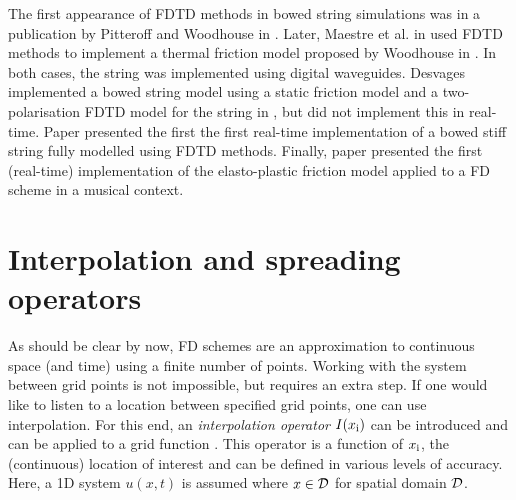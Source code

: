 The first appearance of FDTD methods in bowed string simulations was in a publication by Pitteroff and Woodhouse in \cite{Pitteroff1998}. Later, Maestre et al. in \cite{Maestre2014} used FDTD methods to implement a thermal friction model proposed by Woodhouse in \cite{Woodhouse2003}. In both cases, the string was implemented using digital waveguides. Desvages implemented a bowed string model using a static friction model and a two-polarisation FDTD model for the string in \cite{Desvages2016, Desvages2018}, but did not implement this in real-time. Paper \citeP[A] presented the first the first real-time implementation of a bowed stiff string fully modelled using FDTD methods. Finally, paper \citeP[C] presented the first (real-time) implementation of the elasto-plastic friction model applied to a FD scheme in a musical context.

\section{Interpolation and spreading operators}\label{sec:interpolationSpreading}
As should be clear by now, FD schemes are an approximation to continuous space (and time) using a finite number of points. Working with the system between grid points is not impossible, but requires an extra step. If one would like to listen to a location between specified grid points, one can use interpolation. For this end, an \textit{interpolation operator} $I(x_{\text{i}})$ can be introduced and can be applied to a grid function \cite{theBible}. This operator is a function of $x_{\text{i}}$, the (continuous) location of interest and can be defined in various levels of accuracy. Here, a 1D system $u(x,t)$ is assumed where $x\in \mathcal{D}$ for spatial domain $\mathcal{D}$.

